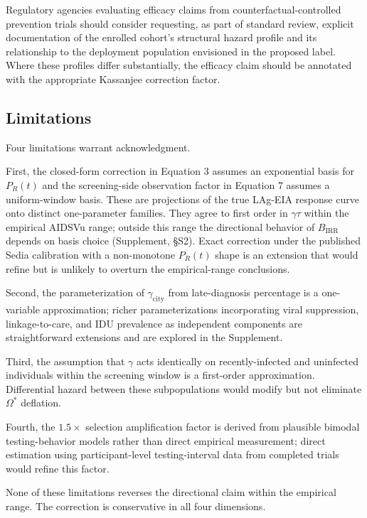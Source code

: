 \documentclass[12pt]{article}
\begin{document}
Regulatory agencies evaluating efficacy claims from counterfactual-controlled prevention trials should consider requesting, as part of standard review, explicit documentation of the enrolled cohort's structural hazard profile and its relationship to the deployment population envisioned in the proposed label. Where these profiles differ substantially, the efficacy claim should be annotated with the appropriate Kassanjee correction factor.

\subsection{Limitations}

Four limitations warrant acknowledgment.

First, the closed-form correction in Equation 3 assumes an exponential basis for $P_R(t)$ and the screening-side observation factor in Equation 7 assumes a uniform-window basis. These are projections of the true LAg-EIA response curve onto distinct one-parameter families. They agree to first order in $\gamma\tau$ within the empirical AIDSVu range; outside this range the directional behavior of $B_{\mathrm{IRR}}$ depends on basis choice (Supplement, \S S2). Exact correction under the published Sedia calibration with a non-monotone $P_R(t)$ shape is an extension that would refine but is unlikely to overturn the empirical-range conclusions.

Second, the parameterization of $\gamma_{\mathrm{city}}$ from late-diagnosis percentage is a one-variable approximation; richer parameterizations incorporating viral suppression, linkage-to-care, and IDU prevalence as independent components are straightforward extensions and are explored in the Supplement.

Third, the assumption that $\gamma$ acts identically on recently-infected and uninfected individuals within the screening window is a first-order approximation. Differential hazard between these subpopulations would modify but not eliminate $\Omega^*$ deflation.

Fourth, the $1.5\times$ selection amplification factor is derived from plausible bimodal testing-behavior models rather than direct empirical measurement; direct estimation using participant-level testing-interval data from completed trials would refine this factor.

None of these limitations reverses the directional claim within the empirical range. The correction is conservative in all four dimensions.
\end{document}
